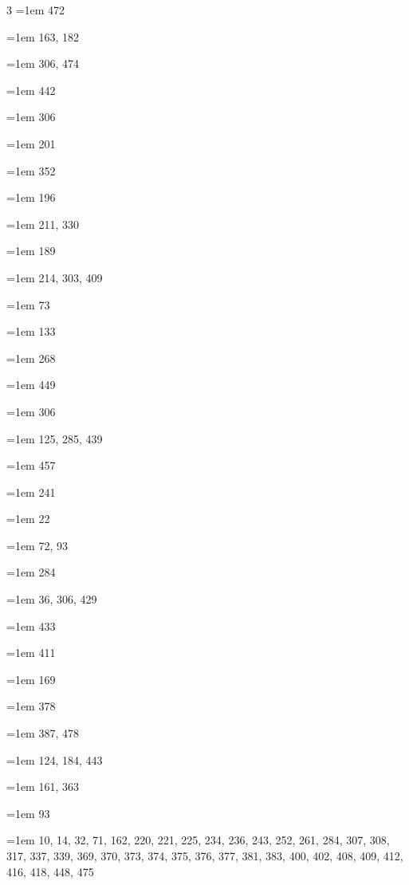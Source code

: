 \begin{multicols}{3}
\hangindent=1em  472\par
\hangindent=1em  163, 182\par
\hangindent=1em  306, 474\par
\hangindent=1em  442\par
\hangindent=1em  306\par
\hangindent=1em  201\par
\hangindent=1em  352\par
\hangindent=1em  196\par
\hangindent=1em  211, 330\par
\hangindent=1em  189\par
\hangindent=1em  214, 303, 409\par
\hangindent=1em  73\par
\hangindent=1em  133\par
\hangindent=1em  268\par
\hangindent=1em  449\par
\hangindent=1em  306\par
\hangindent=1em  125, 285, 439\par
\hangindent=1em  457\par
\hangindent=1em  241\par
\hangindent=1em  22\par
\hangindent=1em  72, 93\par
\hangindent=1em  284\par
\hangindent=1em  36, 306, 429\par
\hangindent=1em  433\par
\hangindent=1em  411\par
\hangindent=1em  169\par
\hangindent=1em  378\par
\hangindent=1em  387, 478\par
\hangindent=1em  124, 184, 443\par
\hangindent=1em  161, 363\par
\hangindent=1em  93\par
\hangindent=1em  10, 14, 32, 71, 162, 220, 221, 225, 234, 236, 243, 252, 261, 284, 307, 308, 317, 337, 339, 369, 370, 373, 374, 375, 376, 377, 381, 383, 400, 402, 408, 409, 412, 416, 418, 448, 475\par

\end{multicols}
